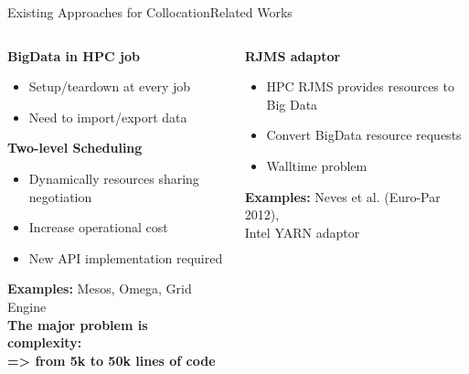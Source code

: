 \documentclass[10pt, compress, titleprogressbar, aspectratio=169]{beamer}
\begin{document}
        \begin{frame}{Existing Approaches for Collocation}{Related Works}
            \begin{columns}
                \begin{column}[t]{0.45\textwidth}
                    \textbf{BigData in HPC job}
                    \begin{itemize}
                        \item Setup/teardown at every job
                        \item Need to import/export data
                    \end{itemize}
                    \vspace{0.5em}
                    \textbf{Two-level Scheduling}
                    \begin{itemize}
                        \item Dynamically resources sharing negotiation
                        \item Increase operational cost
                        \item New API implementation required
                    \end{itemize}
                    \textbf{Examples:} Mesos, Omega, Grid Engine\\
                    \vspace{0.5em}
                    \textbf{The major problem is complexity:\\=> from 5k to 50k lines of code}
                    \vspace{0.5em}
                \end{column}
                \begin{column}[t]{0.5\textwidth}
                    \textbf{RJMS adaptor}
                    \begin{itemize}
                        \item HPC RJMS provides resources to Big Data
                        \item Convert BigData resource requests
                        \item Walltime problem
                    \end{itemize}
                    \textbf{Examples:} Neves et al. (Euro-Par 2012),\\\hspace{2em}Intel YARN adaptor

\end{column}
\end{columns}
\end{frame}
\end{document}
